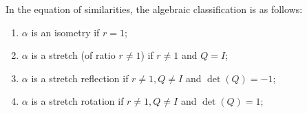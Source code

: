 \begin{theorem}
    In the equation of similarities, the algebraic classification is as follows:
    \begin{enumerate}
        \item \(\alpha\) is an isometry if \(r = 1\);
        \item \(\alpha\) is a stretch (of ratio \(r \neq 1\)) if \(r \neq 1\) and \(Q = I\);
        \item \(\alpha\) is a stretch reflection if \(r \neq 1, Q \neq I\) and \(\det(Q) = -1\);
        \item \(\alpha\) is a stretch rotation if \(r \neq 1, Q \neq I\) and \(\det(Q) = 1\);
    \end{enumerate}
\end{theorem}

\pagebreak